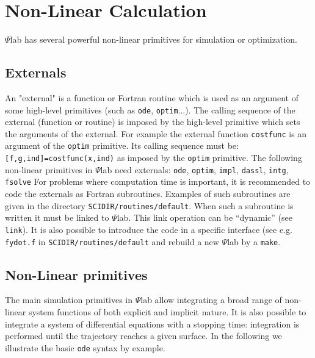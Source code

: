 \section{Non-Linear Calculation}
\label{ch6}

	$\Psi$lab has several powerful non-linear primitives for simulation
or optimization.
\subsection{Externals}
An "external" is a function or Fortran routine which is used as an argument
of some high-level primitives (such as {\tt ode}, {\tt optim}...).
The calling sequence of the external (function or routine) is imposed by
the high-level primitive which sets the arguments of the external.
For example the external function {\tt costfunc} is an argument of 
the {\tt optim} primitive. Its calling sequence must be: 
{\tt [f,g,ind]=costfunc(x,ind)} as imposed by the {\tt optim} primitive.
The following non-linear primitives in $\Psi$lab need externals: 
{\tt ode}, {\tt optim}, {\tt impl}, {\tt dassl}, {\tt intg}, {\tt fsolve}
For problems where computation time is important, it is recommended
to code the externals as Fortran subroutines. Examples of such
subroutines are given in the directory {\tt SCIDIR/routines/default}.
When such a subroutine is written it must be linked to $\Psi$lab.
This link operation can be ``dynamic'' (see {\tt link}). It is
also possible to introduce the code in a specific interface (see e.g.
{\tt fydot.f} in {\tt SCIDIR/routines/default} and rebuild a new $\Psi$lab
by a {\tt make}.

\subsection{Non-Linear primitives}
The main simulation primitives
in $\Psi$lab allow integrating a broad range of non-linear system functions of
both explicit and implicit nature. It is also possible to integrate
a system of differential equations with a stopping time: 
integration is performed until the trajectory reaches a given surface.
In the following we illustrate the basic {\tt ode} syntax by example.


